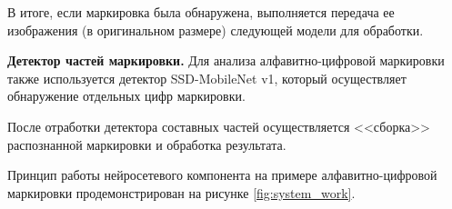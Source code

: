 В итоге, если маркировка была обнаружена, выполняется передача ее изображения (в оригинальном размере) следующей модели для обработки.


\textbf{Детектор частей маркировки.} Для анализа алфавитно-цифровой маркировки также используется детектор SSD-MobileNet v1, который осуществляет обнаружение отдельных цифр маркировки.

После отработки детектора составных частей осуществляется <<сборка>> распознанной маркировки и обработка результата.

Принцип работы нейросетевого компонента на примере алфавитно-цифровой маркировки продемонстрирован на рисунке \ref{fig:system_work}.

